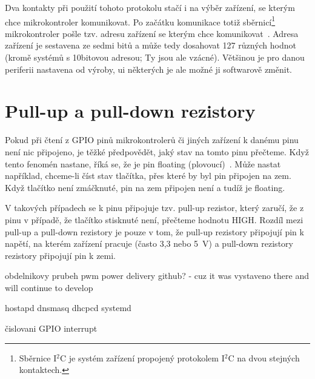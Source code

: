 Dva kontakty při použití tohoto protokolu stačí i na výběr zařízení, se kterým chce mikrokontroler komunikovat.
Po začátku komunikace totiž sběrnicí\footnote{Sběrnice I$^{2}$C je systém zařízení propojený protokolem I$^{2}$C na dvou stejných kontaktech.} mikrokontroler pošle tzv. adresu zařízení se kterým chce komunikovat~\cite{sparkfun-i2c}.
Adresa zařízení je sestavena ze sedmi bitů a může tedy dosahovat 127 různých hodnot (kromě systémů s 10bitovou adresou; Ty jsou ale vzácné).
Většinou je pro danou periferii nastavena od výroby, ui některých je ale možné ji softwarově změnit.

\section{Pull-up a pull-down rezistory}
Pokud při čtení z GPIO pinů mikrokontrolerů či jiných zařízení k danému pinu není nic připojeno, je těžké předpovědět, jaký stav na tomto pinu přečteme.
Když tento fenomén nastane, říká se, že je pin floating (plovoucí)~\cite{sparkfun-pud}.
Může nastat například, chceme-li číst stav tlačítka, přes které by byl pin připojen na zem. Když tlačítko není zmáčknuté, pin na zem připojen není a tudíž je floating.

V takových případech se k pinu připojuje tzv. pull-up rezistor, který zaručí, že z pinu v případě, že tlačítko stisknuté není, přečteme hodnotu HIGH.
Rozdíl mezi pull-up a pull-down rezistory je pouze v tom, že pull-up rezistory připojují pin k napětí, na kterém zařízení pracuje (často 3,3 nebo 5~V) a pull-down rezistory rezistory připojují pin k zemi.~\cite{sparkfun-pud}


obdelnikovy prubeh
pwm
power delivery
github? - cuz it was vystaveno there and will continue to develop

hostapd dnsmasq dhcpcd systemd

čislovani GPIO
interrupt

